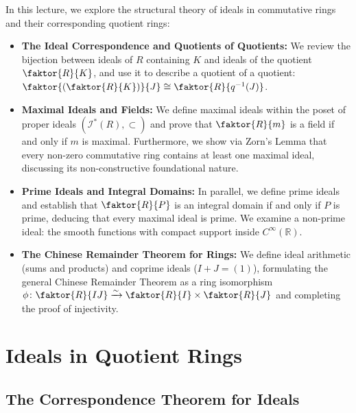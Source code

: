 

\begin{overview}
In this lecture, we explore the structural theory of ideals in commutative rings and their corresponding quotient rings:
\begin{itemize}
    \item \textbf{The Ideal Correspondence and Quotients of Quotients:} We review the bijection between ideals of $R$ containing $K$ and ideals of the quotient $\faktor{R}{K}$, and use it to describe a quotient of a quotient: $\faktor{\left(\faktor{R}{K}\right)}{J} \cong \faktor{R}{q^{-1}(J)}$.
    \item \textbf{Maximal Ideals and Fields:} We define maximal ideals within the poset of proper ideals $(\mathscr{I}^*(R), \subset)$ and prove that $\faktor{R}{m}$ is a field if and only if $m$ is maximal. Furthermore, we show via Zorn's Lemma that every non-zero commutative ring contains at least one maximal ideal, discussing its non-constructive foundational nature.
    \item \textbf{Prime Ideals and Integral Domains:} In parallel, we define prime ideals and establish that $\faktor{R}{P}$ is an integral domain if and only if $P$ is prime, deducing that every maximal ideal is prime. We examine a non-prime ideal: the smooth functions with compact support inside $C^\infty(\mathbb{R})$.
    \item \textbf{The Chinese Remainder Theorem for Rings:} We define ideal arithmetic (sums and products) and coprime ideals ($I + J = (1)$), formulating the general Chinese Remainder Theorem as a ring isomorphism $\phi \colon \faktor{R}{IJ} \xrightarrow{\sim} \faktor{R}{I} \times \faktor{R}{J}$ and completing the proof of injectivity.
\end{itemize}
\end{overview}

\section{Ideals in Quotient Rings}

\subsection{The Correspondence Theorem for Ideals}


